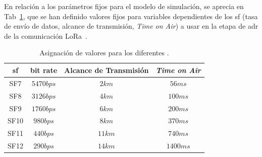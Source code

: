 \begin{justify}
\begin{itemize}
\end{itemize}
\noindent
En relación a los parámetros fijos para el modelo de simulación, se aprecia en Tab~\ref{tab:par}, que se han definido valores fijos para variables dependientes de los \gls{sf} (tasa de envío de datos, alcance de transmisión, \textit{Time on Air}) a usar en la etapa de \gls{adr} de la comunicación LoRa~\cite{orange}.
\begin{table}[!ht]
\centering
\begin{tabular}{|c|c|c|c|}
\hline
\gls{sf} & bit rate & Alcance de Transmisión & \textit{Time on Air}\\ \hline
SF7 & $5470bps$ & $2km$ & $56ms$ \\ \hline
SF8 & $3126bps$ & $4km$ & $100ms$ \\ \hline
SF9 & $1760bps$ & $6km$ & $200ms$ \\ \hline
SF10 & $980bps$ & $8km$ & $370ms$ \\ \hline
SF11 & $440bps$ & $11km$ & $740ms$ \\ \hline
SF12 & $290bps$ & $14km$ & $1400ms$ \\ 
\hline
\end{tabular}
\caption{Asignación de valores para los diferentes .}
\label{tab:par}
\end{table}

\end{justify}
